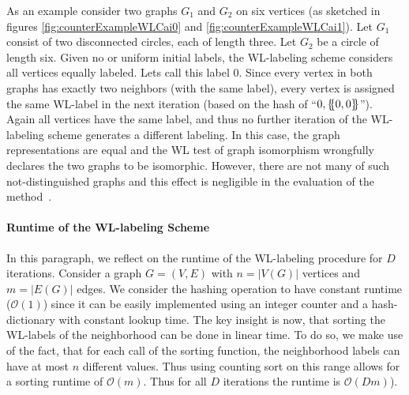 		As an example consider two graphs $G_1$ and $G_2$ on six vertices (as sket\-ched in figures \ref{fig:counterExampleWLCai0} and \ref{fig:counterExampleWLCai1}). 
		Let $G_1$ consist of two disconnected circles, each of length three. Let $G_2$ be a circle of length six. 
		Given no or uniform initial labels, the WL-labeling scheme considers all vertices equally labeled.
		Lets call this label $0$. 
		Since every vertex in both graphs has exactly two neighbors (with the same label), every vertex is assigned the same WL-label in the next iteration (based on the hash of \enquote{$0, \{\mskip-5mu\{{0, 0}\}\mskip-5mu\}$}).
		Again all vertices have the same label, and thus no further iteration of the WL-labeling scheme generates a different labeling.
		In this case, the graph representations are equal and the WL test of graph isomorphism wrongfully declares the two graphs to be isomorphic.
		However, there are not many of such not-distinguished graphs and this effect is negligible in the evaluation of the method~\cite{1992_Cai_IEEE}.
		
		\paragraph{Runtime of the WL-labeling Scheme}				
		In this paragraph, we reflect on the runtime of the WL-labeling procedure for $D$ iterations.		
		Consider a graph $G=(V, E)$ with $n=|V(G)|$ vertices and $m=|E(G)|$ edges.
		We consider the hashing operation to have constant runtime ($\mathcal{O}(1)$) since it can be easily implemented using an integer counter and a hash-dictionary with constant lookup time.
		The key insight is now, that sorting the WL-labels of the neighborhood can be done in linear time.
		To do so, we make use of the fact, that for each call of the sorting function, the neighborhood labels can have at most $n$ different values.
		Thus using counting sort on this range allows for a sorting runtime of $\mathcal{O}(m)$.		
		Thus for all $D$ iterations the runtime is $\mathcal{O}(Dm)$).
						
